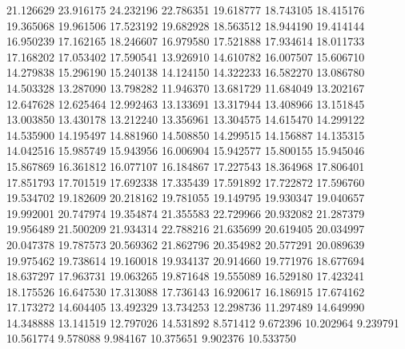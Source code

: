 21.126629
23.916175
24.232196
22.786351
19.618777
18.743105
18.415176
19.365068
19.961506
17.523192
19.682928
18.563512
18.944190
19.414144
16.950239
17.162165
18.246607
16.979580
17.521888
17.934614
18.011733
17.168202
17.053402
17.590541
13.926910
14.610782
16.007507
15.606710
14.279838
15.296190
15.240138
14.124150
14.322233
16.582270
13.086780
14.503328
13.287090
13.798282
11.946370
13.681729
11.684049
13.202167
12.647628
12.625464
12.992463
13.133691
13.317944
13.408966
13.151845
13.003850
13.430178
13.212240
13.356961
13.304575
14.615470
14.299122
14.535900
14.195497
14.881960
14.508850
14.299515
14.156887
14.135315
14.042516
15.985749
15.943956
16.006904
15.942577
15.800155
15.945046
15.867869
16.361812
16.077107
16.184867
17.227543
18.364968
17.806401
17.851793
17.701519
17.692338
17.335439
17.591892
17.722872
17.596760
19.534702
19.182609
20.218162
19.781055
19.149795
19.930347
19.040657
19.992001
20.747974
19.354874
21.355583
22.729966
20.932082
21.287379
19.956489
21.500209
21.934314
22.788216
21.635699
20.619405
20.034997
20.047378
19.787573
20.569362
21.862796
20.354982
20.577291
20.089639
19.975462
19.738614
19.160018
19.934137
20.914660
19.771976
18.677694
18.637297
17.963731
19.063265
19.871648
19.555089
16.529180
17.423241
18.175526
16.647530
17.313088
17.736143
16.920617
16.186915
17.674162
17.173272
14.604405
13.492329
13.734253
12.298736
11.297489
14.649990
14.348888
13.141519
12.797026
14.531892
8.571412
9.672396
10.202964
9.239791
10.561774
9.578088
9.984167
10.375651
9.902376
10.533750
